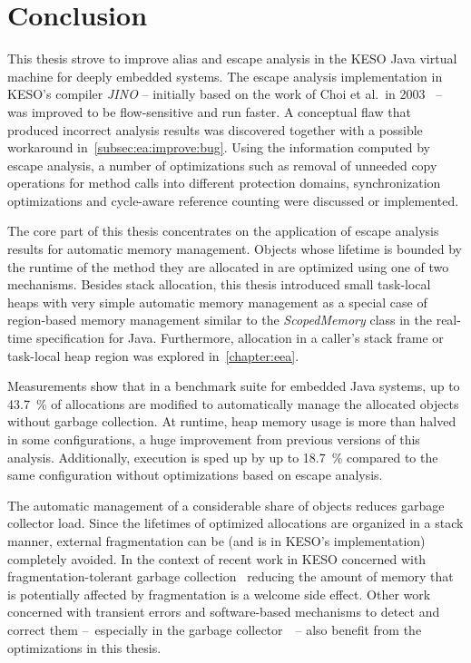 
\chapter{Conclusion}
	\label{chapter:conclusion}
	This thesis strove to improve alias and escape analysis in the KESO Java virtual machine for deeply embedded systems.
	The escape analysis implementation in KESO's compiler \emph{JINO} – initially based on the work of Choi et al.\ in
	2003~\cite{choi:03:toplas} – was improved to be flow-sensitive and run faster. A conceptual flaw that produced
	incorrect analysis results was discovered together with a possible workaround in~\cref{subsec:ea:improve:bug}. Using
	the information computed by escape analysis, a number of optimizations such as removal of unneeded copy operations for
	method calls into different protection domains, synchronization optimizations and cycle-aware reference counting were
	discussed or implemented.

	The core part of this thesis concentrates on the application of escape analysis results for automatic memory
	management. Objects whose lifetime is bounded by the runtime of the method they are allocated in are optimized using
	one of two mechanisms. Besides stack allocation, this thesis introduced small task-local heaps with very simple
	automatic memory management as a special case of region-based memory management similar to the \emph{ScopedMemory}
	class in the real-time specification for Java. Furthermore, allocation in a caller's stack frame or task-local heap
	region was explored in~\cref{chapter:eea}.

	Measurements show that in a benchmark suite for embedded Java systems, up to 43.7~\% of allocations are modified to
	automatically manage the allocated objects without garbage collection. At runtime, heap memory usage is more than
	halved in some configurations, a huge improvement from previous versions of this analysis. Additionally, execution is
	sped up by up to 18.7~\% compared to the same configuration without optimizations based on escape analysis.

	The automatic management of a considerable share of objects reduces garbage collector load. Since the lifetimes of
	optimized allocations are organized in a stack manner, external fragmentation can be (and is in KESO's implementation)
	completely avoided. In the context of recent work in KESO concerned with fragmentation-tolerant garbage
	collection~\cite{strotz:14} reducing the amount of memory that is potentially affected by fragmentation is a welcome
	side effect. Other work concerned with transient errors and software-based mechanisms to detect and correct them
	–~especially in the garbage collector~\cite{taffner:14}~– also benefit from the optimizations in this thesis.

